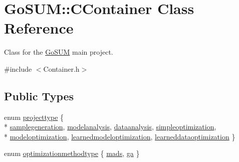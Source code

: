 \hypertarget{class_go_s_u_m_1_1_c_container}{\section{Go\-S\-U\-M\-:\-:C\-Container Class Reference}
\label{class_go_s_u_m_1_1_c_container}
}


Class for the \hyperlink{struct_go_s_u_m}{Go\-S\-U\-M} main project.  




{\ttfamily \#include $<$Container.\-h$>$}

\subsection*{Public Types}
\begin{DoxyCompactItemize}
\item 
enum \hyperlink{class_go_s_u_m_1_1_c_container_ab98aa1c7c84b62772c0f107a997b5076}{projecttype} \{ \\*
\hyperlink{class_go_s_u_m_1_1_c_container_ab98aa1c7c84b62772c0f107a997b5076a553c22b054bed75575138ef807149725}{samplegeneration}, 
\hyperlink{class_go_s_u_m_1_1_c_container_ab98aa1c7c84b62772c0f107a997b5076a856b1d975b7d652aabf185b14dbc7349}{modelanalysis}, 
\hyperlink{class_go_s_u_m_1_1_c_container_ab98aa1c7c84b62772c0f107a997b5076a7e6eb61ed0be28bdb7360e57bd12a4a6}{dataanalysis}, 
\hyperlink{class_go_s_u_m_1_1_c_container_ab98aa1c7c84b62772c0f107a997b5076a6bd715b658b71fd8840f34b80cf2f359}{simpleoptimization}, 
\\*
\hyperlink{class_go_s_u_m_1_1_c_container_ab98aa1c7c84b62772c0f107a997b5076a7c6463760279900e28106a461587c84d}{modeloptimization}, 
\hyperlink{class_go_s_u_m_1_1_c_container_ab98aa1c7c84b62772c0f107a997b5076a5c15fd06dbc47d2027fe5bb24399b3df}{learnedmodeloptimization}, 
\hyperlink{class_go_s_u_m_1_1_c_container_ab98aa1c7c84b62772c0f107a997b5076ad48581dcb217d884472e19be506dc8b3}{learneddataoptimization}
 \}
\item 
enum \hyperlink{class_go_s_u_m_1_1_c_container_a1bcf4ef46bf23d5c838e8a5c20953e82}{optimizationmethodtype} \{ \hyperlink{class_go_s_u_m_1_1_c_container_a1bcf4ef46bf23d5c838e8a5c20953e82a850013e22edc31b4ca212a377036eda5}{mads}, 
\hyperlink{class_go_s_u_m_1_1_c_container_a1bcf4ef46bf23d5c838e8a5c20953e82a165e1070fd11356595906b7fa59dee2b}{ga}
 \}
\end{DoxyCompactItemize}
